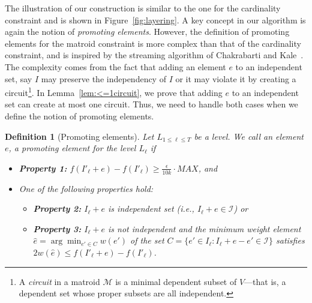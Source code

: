 \documentclass[11pt]{article}
\newtheorem{definition}{Definition}[section]
\newcommand{\mI}{{\mathcal{I}}}
\begin{document}
The illustration of our construction is similar to the one for the cardinality constraint and 
is shown in Figure~\ref{fig:layering}. 
A key concept in our algorithm is again the notion of \emph{promoting elements}. 
However, the definition of promoting elements for the matroid constraint is more 
complex than that of the cardinality constraint,
and is inspired by the streaming algorithm of Chakrabarti and Kale~\cite{chakrabarti2015submodular}. 
The complexity comes from the fact that adding an element $e$ to an independent set, say $I$ may 
preserve the independency of $I$ or it may violate it by 
creating a circuit\footnote{A \emph{circuit} in a matroid $\mathcal{M}$ is a minimal dependent subset of $V$—that is, 
a dependent set whose proper subsets are all independent. }. 
In Lemma~\ref{lem:<=1circuit}, we prove that adding $e$ to an independent set can create at most one circuit.
Thus, we need to handle both cases when we define the notion of promoting elements. 

\begin{tcolorbox}[width=\linewidth, colback=white!80!gray,boxrule=0pt,frame hidden, sharp corners]

\begin{definition}[Promoting elements]
Let $L_{1 \le \ell \le T}$ be a level.
We call an element $e$, a promoting element for the level $L_{\ell}$  if 
\begin{itemize}
    \item \textbf{Property 1:} $f(I'_{\ell} + e) - f(I'_{\ell}) \ge \frac{\epsilon}{10k}\cdot MAX$, and 
    \item One of the following properties hold: 
        \begin{itemize}
            \item \textbf{Property 2: } $I_{\ell} + e$ is independent set (i.e., $I_{\ell}+e \in \mathcal{I}$) \emph{or}
            \item \textbf{Property 3: } $I_{\ell} +e$ is not independent and
            the minimum weight element $\hat{e} = \arg\min_{e' \in C} w(e')$ of 
            the set $C = \{ e' \in I_{\ell}: I_{\ell} + e - e' \in \mI\}$ satisfies 
            $2w(\hat{e}) \le {f(I'_{\ell} + e) - f(I'_{\ell})}$. 
        \end{itemize}    
\end{itemize}
\end{definition}

\end{tcolorbox}
\end{document}

